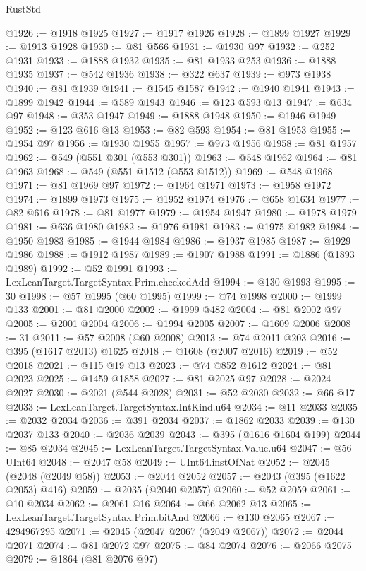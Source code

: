 \begin{lexlean}{RustStd}
\begin{coremodule}
@1926 := @1918 @1925
@1927 := @1917 @1926
@1928 := @1899 @1927
@1929 := @1913 @1928
@1930 := @81 @566
@1931 := @1930 @97
@1932 := @252 @1931
@1933 := @1888 @1932
@1935 := @81 @1933 @253
@1936 := @1888 @1935
@1937 := @542 @1936
@1938 := @322 @637
@1939 := @973 @1938
@1940 := @81 @1939
@1941 := @1545 @1587
@1942 := @1940 @1941
@1943 := @1899 @1942
@1944 := @589 @1943
@1946 := @123 @593 @13
@1947 := @634 @97
@1948 := @353 @1947
@1949 := @1888 @1948
@1950 := @1946 @1949
@1952 := @123 @616 @13
@1953 := @82 @593
@1954 := @81 @1953
@1955 := @1954 @97
@1956 := @1930 @1955
@1957 := @973 @1956
@1958 := @81 @1957
@1962 := @549 (@551 @301 (@553 @301))
@1963 := @548 @1962
@1964 := @81 @1963
@1968 := @549 (@551 @1512 (@553 @1512))
@1969 := @548 @1968
@1971 := @81 @1969 @97
@1972 := @1964 @1971
@1973 := @1958 @1972
@1974 := @1899 @1973
@1975 := @1952 @1974
@1976 := @658 @1634
@1977 := @82 @616
@1978 := @81 @1977
@1979 := @1954 @1947
@1980 := @1978 @1979
@1981 := @636 @1980
@1982 := @1976 @1981
@1983 := @1975 @1982
@1984 := @1950 @1983
@1985 := @1944 @1984
@1986 := @1937 @1985
@1987 := @1929 @1986
@1988 := @1912 @1987
@1989 := @1907 @1988
@1991 := @1886 (@1893 @1989)
@1992 := @52 @1991
@1993 := LexLeanTarget.TargetSyntax.Prim.checkedAdd
@1994 := @130 @1993
@1995 := 30
@1998 := @57 @1995 (@60 @1995)
@1999 := @74 @1998
@2000 := @1999 @133
@2001 := @81 @2000
@2002 := @1999 @482
@2004 := @81 @2002 @97
@2005 := @2001 @2004
@2006 := @1994 @2005
@2007 := @1609 @2006
@2008 := 31
@2011 := @57 @2008 (@60 @2008)
@2013 := @74 @2011 @203
@2016 := @395 (@1617 @2013) @1625
@2018 := @1608 (@2007 @2016)
@2019 := @52 @2018
@2021 := @115 @19 @13
@2023 := @74 @852 @1612
@2024 := @81 @2023
@2025 := @1459 @1858
@2027 := @81 @2025 @97
@2028 := @2024 @2027
@2030 := @2021 (@544 @2028)
@2031 := @52 @2030
@2032 := @66 @17
@2033 := LexLeanTarget.TargetSyntax.IntKind.u64
@2034 := @11 @2033
@2035 := @2032 @2034
@2036 := @391 @2034
@2037 := @1862 @2033
@2039 := @130 @2037 @133
@2040 := @2036 @2039
@2043 := @395 (@1616 @1604 @199)
@2044 := @85 @2034
@2045 := LexLeanTarget.TargetSyntax.Value.u64
@2047 := @56 UInt64
@2048 := @2047 @58
@2049 := UInt64.instOfNat
@2052 := @2045 (@2048 (@2049 @58))
@2053 := @2044 @2052
@2057 := @2043 (@395 (@1622 @2053) @416)
@2059 := @2035 (@2040 @2057)
@2060 := @52 @2059
@2061 := @10 @2034
@2062 := @2061 @16
@2064 := @66 @2062 @13
@2065 := LexLeanTarget.TargetSyntax.Prim.bitAnd
@2066 := @130 @2065
@2067 := 4294967295
@2071 := @2045 (@2047 @2067 (@2049 @2067))
@2072 := @2044 @2071
@2074 := @81 @2072 @97
@2075 := @84 @2074
@2076 := @2066 @2075
@2079 := @1864 (@81 @2076 @97)

\end{coremodule}
\end{lexlean}
